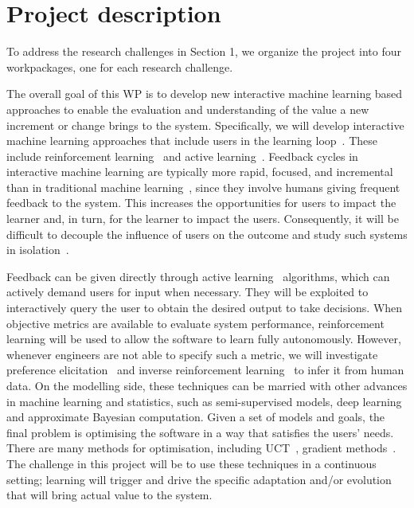 \documentclass[12pt]{article}
\begin{document}
\vspace{-.5cm}


\section{Project description}


To address the research challenges in Section 1, we organize the project into four workpackages, one for each research challenge.

\vspace{.2cm}
  
\noindent The overall goal of this WP is to develop new interactive
machine learning based approaches to enable the evaluation and
understanding of the value a new increment or change brings to the
system.  Specifically, we will develop interactive machine learning approaches
that include users in the learning
loop~\cite{interactiveMachineLearning}.  These include reinforcement
learning~\cite{suba,BertsekasTsitsiklis:NDP} and active
learning~\cite{ActiveLearning}. Feedback cycles in interactive machine
learning are typically more rapid, focused, and incremental than in
traditional machine
learning~\cite{interactiveMachineLearningExperience}, since they
involve humans giving frequent feedback to the system.  This increases
the opportunities for users to impact the learner and, in turn, for
the learner to impact the users. Consequently, it will be difficult to
decouple the influence of users on the outcome and study such systems
in isolation~\cite{interactiveMachineLearningExperience}.


Feedback can be given directly through active
learning~\cite{ActiveLearning} algorithms, which can actively demand
users for input when necessary.  They will be exploited to
interactively query the user to obtain the desired output to take
decisions. When objective metrics are available to evaluate system
performance, reinforcement learning will be used to allow the software
to learn fully autonomously.  However, whenever engineers are not able
to specify such a metric, we will investigate preference
elicitation~\cite{rothkopf:peirl:ecml:2011} and inverse reinforcement
learning~\cite{uai:irl,Choi:NPBIRL:nips2012} to infer it from human
data. 
On the modelling side, these techniques can be married with other
advances in machine learning and statistics, such as semi-supervised
models, deep learning and approximate Bayesian computation. Given a
set of models and goals, the final problem is optimising the software in a way that satisfies the users' needs. There are many methods
for optimisation, including UCT~\cite{ECML:Kocsis+Szepesvari:2006},
gradient
methods~\cite{dimitrakakis:gbrl,ghavamzadeh:bpga,knowgrad}. The
challenge in this project will be to use these techniques in a
continuous setting; learning will trigger and drive the specific
adaptation and/or evolution that will bring actual value to the
system.
\end{document}
